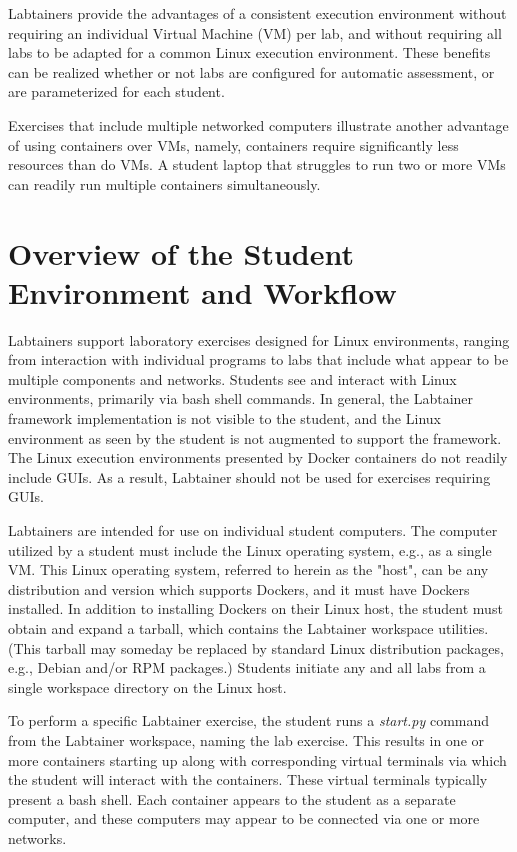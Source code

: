 \documentclass{article}
\begin{document}
Labtainers provide the advantages of a consistent
execution environment without requiring
an individual Virtual Machine (VM) per lab, and without requiring all labs to be adapted for
a common Linux execution environment.   These benefits can be realized 
whether or not labs are configured for automatic assessment, 
or are parameterized for each student.

Exercises that include multiple networked computers illustrate another advantage 
of using containers over VMs, namely, containers require significantly less resources
than do VMs.  A student laptop that struggles to run two or more VMs can readily 
run multiple containers simultaneously. 

\section {Overview of the Student Environment and Workflow}
Labtainers support laboratory exercises designed for Linux environments,
ranging from interaction with individual programs to labs that include
what appear to be multiple components and networks.  Students see and interact with Linux
environments, primarily via bash shell commands. In general, the Labtainer
framework implementation is not visible to the student, and the Linux
environment as seen by the student is not augmented to support the framework.
The Linux execution environments presented by Docker containers do not readily
include GUIs.  As a result, Labtainer should not be used for exercises requiring
GUIs.

Labtainers are intended for use on individual student computers.
The computer utilized by a student must include the Linux operating system, e.g.,
as a single VM.  This Linux operating system, referred to herein
as the "host", can be any distribution and version
which supports Dockers, and it must have Dockers installed.  
In addition to installing Dockers on their Linux host, the student must
obtain and expand a tarball, which contains the Labtainer workspace utilities.
(This tarball may someday be replaced by standard Linux distribution packages,
e.g., Debian and/or RPM packages.)  Students initiate any and all labs from a
single workspace directory on the Linux host.

To perform a specific Labtainer exercise, the student runs a \textit{start.py} command from
the Labtainer workspace, naming the lab exercise.  This results in one or more
containers starting up along with corresponding virtual terminals via which the 
student will interact with the containers.  These virtual terminals typically
present a bash shell.  Each container appears to the student as a separate
computer, and these computers may appear to be connected via one or more networks.  
\end{document}

